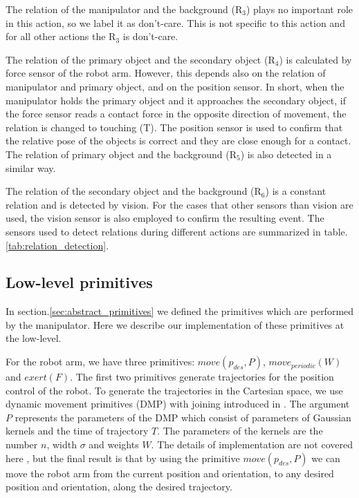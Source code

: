The relation of the manipulator and the background ($\text{R}_3$) plays no important role in this action, so we label it as don't-care.
This is not specific to this action and for all other actions the $\text{R}_3$ is don't-care.


The relation of the primary object and the secondary object ($\text{R}_4$) is calculated by force sensor of the robot arm.
However, this depends also on the relation of manipulator and primary object, and on the position sensor.
In short, when the manipulator holds the primary object and it approaches the secondary object,
if the force sensor reads a contact force in the opposite direction of movement, the relation is changed to touching (T).
The position sensor is used to confirm that the relative pose of the objects is correct and they are close enough for a contact.
The relation of primary object and the background ($\text{R}_5$) is also detected in a similar way.

The relation of the secondary object and the background ($\text{R}_6$) is a constant relation and is detected by vision.
For the cases that other sensors than vision are used, the vision sensor is also employed to confirm the resulting event.
The sensors used to detect relations during different actions are summarized in table.\ref{tab:relation_detection}.


\subsection{Low-level primitives}
\label{section_primitives}
In section.\ref{sec:abstract_primitives} we defined the primitives which are performed by the manipulator.
Here we describe our implementation of these primitives at the low-level.

For the robot arm, we have three primitives: $move(p_{des},P)$, $move_{periodic}(W)$ and $exert(F)$.
The first two primitives generate trajectories for the position control of the robot.
To generate the trajectories in the Cartesian space, we use dynamic movement primitives (DMP) with joining introduced in \cite{Kulvicius2012}.
The argument $P$ represents the parameters of the DMP which consist of parameters of Gaussian kernels and the time of trajectory $T$.
The parameters of the kernels are the number $n$, width $\sigma$ and weights $W$.
The details of implementation are not covered here , but the final result is that by using the primitive $move(p_{des},P)$
we can move the robot arm from the current position and orientation, to any desired position and orientation, along the desired trajectory.

